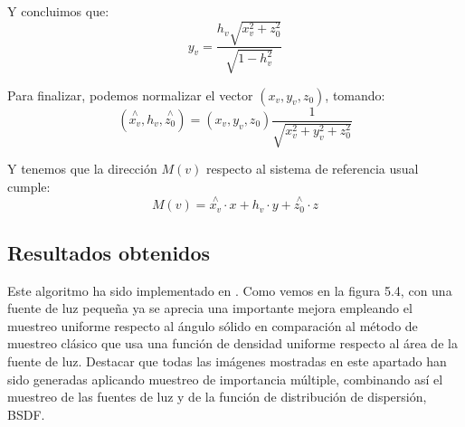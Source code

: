 Y concluimos que:
$$y_v = \frac{h_v \sqrt{x_v^2+z_0^2}}{\sqrt{1-h_v^2}}$$

Para finalizar, podemos normalizar el vector $(x_v, y_v, z_0)$, tomando:
$$(\overset{\wedge}{x_v}, h_v, \overset{\wedge}{z_0}) = (x_v, y_v, z_0)\frac{1}{\sqrt{x_v^2 + y_v^2 + z_0^2}}$$

Y tenemos que la dirección $M(v)$ respecto al sistema de referencia usual cumple:
$$M(v) = \overset{\wedge}{x_v} \cdot x + h_v\cdot y + \overset{\wedge}{z_0}\cdot z $$

\subsection{Resultados obtenidos}

Este algoritmo ha sido implementado en \cite{pbrtCode}. Como vemos en la figura 5.4, con una fuente de luz pequeña ya se aprecia una importante mejora empleando el muestreo uniforme respecto al ángulo sólido en comparación al método de muestreo clásico que usa una función de densidad uniforme respecto al área de la fuente de luz. Destacar que todas las imágenes mostradas en este apartado han sido generadas aplicando muestreo de importancia múltiple, combinando así el muestreo de las fuentes de luz y de la función de distribución de dispersión, BSDF.

